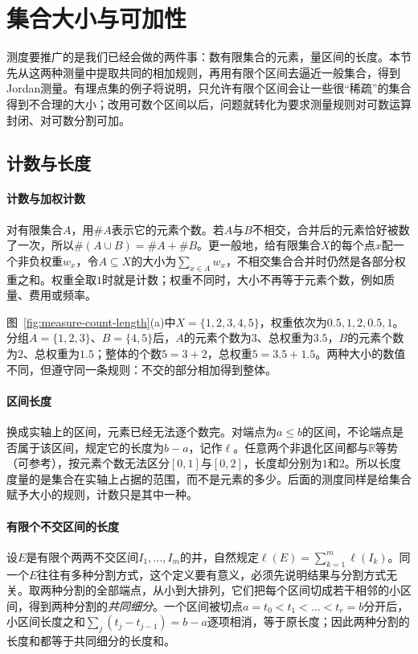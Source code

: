 \section{集合大小与可加性}
\label{sec:measure-size-additivity}

测度要推广的是我们已经会做的两件事：数有限集合的元素，量区间的长度。本节先从这两种测量中提取共同的相加规则，再用有限个区间去逼近一般集合，得到Jordan测量。有理点集的例子将说明，只允许有限个区间会让一些很“稀疏”的集合得到不合理的大小；改用可数个区间以后，问题就转化为要求测量规则对可数运算封闭、对可数分割可加。

\subsection{计数与长度}
\label{sec:measure-counting-length}

\paragraph{计数与加权计数}
对有限集合$A$，用$\#A$表示它的元素个数。若$A$与$B$不相交，合并后的元素恰好被数了一次，所以$\#(A\cup B)=\#A+\#B$。更一般地，给有限集合$X$的每个点$x$配一个非负权重$w_x$，令$A\subseteq X$的大小为$\sum_{x\in A}w_x$，不相交集合合并时仍然是各部分权重之和。权重全取$1$时就是计数；权重不同时，大小不再等于元素个数，例如质量、费用或频率。

图~\ref{fig:measure-count-length}(a)中$X=\{1,2,3,4,5\}$，权重依次为$0.5,1,2,0.5,1$。分组$A=\{1,2,3\}$、$B=\{4,5\}$后，$A$的元素个数为$3$、总权重为$3.5$，$B$的元素个数为$2$、总权重为$1.5$；整体的个数$5=3+2$，总权重$5=3.5+1.5$。两种大小的数值不同，但遵守同一条规则：不交的部分相加得到整体。

\paragraph{区间长度}
换成实轴上的区间，元素已经无法逐个数完。对端点为$a\le b$的区间，不论端点是否属于该区间，规定它的长度为$b-a$，记作$\ell$。任意两个非退化区间都与$\mathbb R$等势（可参考），按元素个数无法区分$[0,1]$与$[0,2]$，长度却分别为$1$和$2$。所以长度度量的是集合在实轴上占据的范围，而不是元素的多少。后面的测度同样是给集合赋予大小的规则，计数只是其中一种。

\paragraph{有限个不交区间的长度}
设$E$是有限个两两不交区间$I_1,\dots,I_m$的并，自然规定$\ell(E)=\sum_{k=1}^m\ell(I_k)$。同一个$E$往往有多种分割方式，这个定义要有意义，必须先说明结果与分割方式无关。取两种分割的全部端点，从小到大排列，它们把每个区间切成若干相邻的小区间，得到两种分割的\emph{共同细分}。一个区间被切点$a=t_0<t_1<\dots<t_r=b$分开后，小区间长度之和$\sum_{j}(t_j-t_{j-1})=b-a$逐项相消，等于原长度；因此两种分割的长度和都等于共同细分的长度和。

